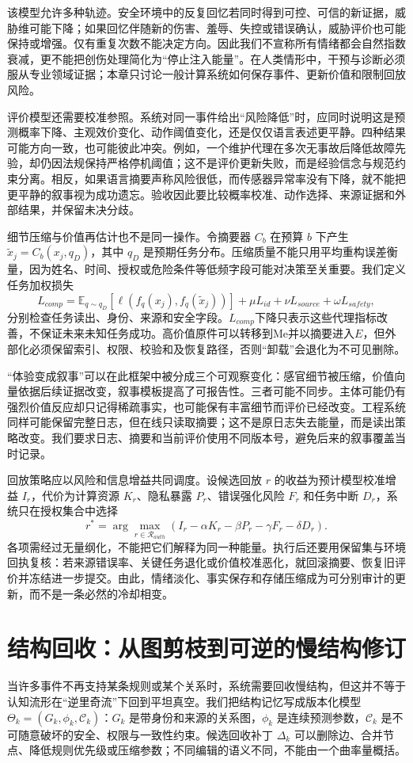 该模型允许多种轨迹。安全环境中的反复回忆若同时得到可控、可信的新证据，威胁维可能下降；如果回忆伴随新的伤害、羞辱、失控或错误确认，威胁评价也可能保持或增强。仅有重复次数不能决定方向。因此我们不宣称所有情绪都会自然指数衰减，更不能把创伤处理简化为“停止注入能量”。在人类情形中，干预与诊断必须服从专业领域证据；本章只讨论一般计算系统如何保存事件、更新价值和限制回放风险。

评价模型还需要校准参照。系统对同一事件给出“风险降低”时，应同时说明这是预测概率下降、主观效价变化、动作阈值变化，还是仅仅语言表述更平静。四种结果可能方向一致，也可能彼此冲突。例如，一个维护代理在多次无事故后降低故障先验，却仍因法规保持严格停机阈值；这不是评价更新失败，而是经验信念与规范约束分离。相反，如果语言摘要声称风险很低，而传感器异常率没有下降，就不能把更平静的叙事视为成功遗忘。验收因此要比较概率校准、动作选择、来源证据和外部结果，并保留未决分歧。

细节压缩与价值再估计也不是同一操作。令摘要器 $C_b$ 在预算 $b$ 下产生 $\tilde x_j=C_b(x_j,q_D)$，其中 $q_D$ 是预期任务分布。压缩质量不能只用平均重构误差衡量，因为姓名、时间、授权或危险条件等低频字段可能对决策至关重要。我们定义任务加权损失
\[
L_{comp}=\mathbb E_{q\sim q_D}\!\left[\ell(f_q(x_j),f_q(\tilde x_j))\right]
+\mu L_{id}+\nu L_{source}+\omega L_{safety},
\]
分别检查任务读出、身份、来源和安全字段。$L_{comp}$下降只表示这些代理指标改善，不保证未来未知任务成功。高价值原件可以转移到Me并以摘要进入$E$，但外部化必须保留索引、权限、校验和及恢复路径，否则“卸载”会退化为不可见删除。

“体验变成叙事”可以在此框架中被分成三个可观察变化：感官细节被压缩，价值向量依据后续证据改变，叙事模板提高了可报告性。三者可能不同步。主体可能仍有强烈价值反应却只记得稀疏事实，也可能保有丰富细节而评价已经改变。工程系统同样可能保留完整日志，但在线只读取摘要；这不是原日志失去能量，而是读出策略改变。我们要求日志、摘要和当前评价使用不同版本号，避免后来的叙事覆盖当时记录。

回放策略应以风险和信息增益共同调度。设候选回放 $r$ 的收益为预计模型校准增益 $I_r$，代价为计算资源 $K_r$、隐私暴露 $P_r$、错误强化风险 $F_r$ 和任务中断 $D_r$，系统只在授权集合中选择
\[
r^*=\arg\max_{r\in\mathcal R_{auth}}
\left(I_r-\alpha K_r-\beta P_r-\gamma F_r-\delta D_r\right).
\]
各项需经过无量纲化，不能把它们解释为同一种能量。执行后还要用保留集与环境回执复核：若来源错误率、关键任务退化或价值校准恶化，就回滚摘要、恢复旧评价并冻结进一步提交。由此，情绪淡化、事实保存和存储压缩成为可分别审计的更新，而不是一条必然的冷却相变。

\section{结构回收：从图剪枝到可逆的慢结构修订}
\label{sec:smoothing_phase}
当许多事件不再支持某条规则或某个关系时，系统需要回收慢结构，但这并不等于认知流形在“逆里奇流”下回到平坦真空。我们把结构记忆写成版本化模型 $\Theta_k=(G_k,\phi_k,\mathcal C_k)$：$G_k$ 是带身份和来源的关系图，$\phi_k$ 是连续预测参数，$\mathcal C_k$ 是不可随意破坏的安全、权限与一致性约束。候选回收补丁 $\Delta_k$ 可以删除边、合并节点、降低规则优先级或压缩参数；不同编辑的语义不同，不能由一个曲率量概括。

